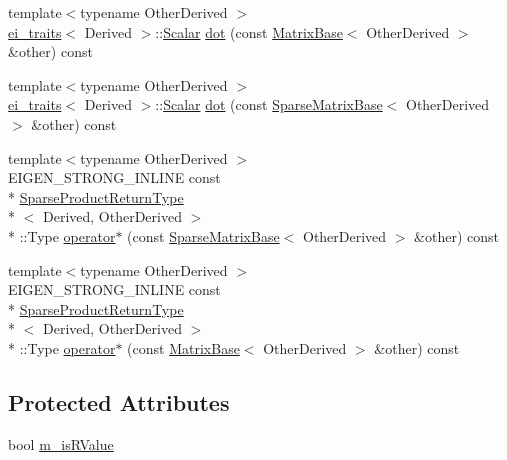 \begin{DoxyCompactItemize}
\item 
{\footnotesize template$<$typename Other\-Derived $>$ }\\\hyperlink{structei__traits}{ei\-\_\-traits}$<$ Derived $>$\-::\hyperlink{class_sparse_matrix_base_af39d70f2b7e775e9e17b666cd24128c8}{Scalar} \hyperlink{class_sparse_matrix_base_aab6f4d49549cd0eb1db484c6db24388f}{dot} (const \hyperlink{class_matrix_base}{Matrix\-Base}$<$ Other\-Derived $>$ \&other) const 
\item 
{\footnotesize template$<$typename Other\-Derived $>$ }\\\hyperlink{structei__traits}{ei\-\_\-traits}$<$ Derived $>$\-::\hyperlink{class_sparse_matrix_base_af39d70f2b7e775e9e17b666cd24128c8}{Scalar} \hyperlink{class_sparse_matrix_base_a399b76dab9e214b7f74e3e5e8523382f}{dot} (const \hyperlink{class_sparse_matrix_base}{Sparse\-Matrix\-Base}$<$ Other\-Derived $>$ \&other) const 
\item 
{\footnotesize template$<$typename Other\-Derived $>$ }\\E\-I\-G\-E\-N\-\_\-\-S\-T\-R\-O\-N\-G\-\_\-\-I\-N\-L\-I\-N\-E const \\*
\hyperlink{struct_sparse_product_return_type}{Sparse\-Product\-Return\-Type}\\*
$<$ Derived, Other\-Derived $>$\\*
\-::Type \hyperlink{class_sparse_matrix_base_a2da5ca03c988688ce8e3779d216ba332}{operator$\ast$} (const \hyperlink{class_sparse_matrix_base}{Sparse\-Matrix\-Base}$<$ Other\-Derived $>$ \&other) const 
\item 
{\footnotesize template$<$typename Other\-Derived $>$ }\\E\-I\-G\-E\-N\-\_\-\-S\-T\-R\-O\-N\-G\-\_\-\-I\-N\-L\-I\-N\-E const \\*
\hyperlink{struct_sparse_product_return_type}{Sparse\-Product\-Return\-Type}\\*
$<$ Derived, Other\-Derived $>$\\*
\-::Type \hyperlink{class_sparse_matrix_base_a194d53b9ae2ae47187e54a23d47b128a}{operator$\ast$} (const \hyperlink{class_matrix_base}{Matrix\-Base}$<$ Other\-Derived $>$ \&other) const 
\end{DoxyCompactItemize}
\subsection*{Protected Attributes}
\begin{DoxyCompactItemize}
\item 
bool \hyperlink{class_sparse_matrix_base_a705c0dcbf2fc870a9a893398904e7d05}{m\-\_\-is\-R\-Value}
\end{DoxyCompactItemize}
